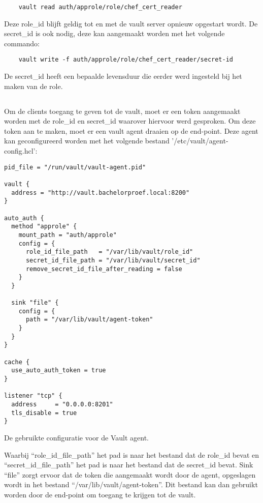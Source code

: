 \begin{verbatim}
    vault read auth/approle/role/chef_cert_reader
\end{verbatim}

Deze role\_id blijft geldig tot en met de vault server opnieuw opgestart wordt. De secret\_id is ook nodig, deze kan aangemaakt worden met het volgende commando:
\begin{verbatim}
    vault write -f auth/approle/role/chef_cert_reader/secret-id
\end{verbatim}
De secret\_id heeft een bepaalde levensduur die eerder werd ingesteld bij het maken van de role.

\subsection{}
\label{subsec:Installeren_van_een_Vault_agent}

Om de clients toegang te geven tot de vault, moet er een token aangemaakt worden met de role\_id en secret\_id waarover hiervoor werd gesproken. Om deze token aan te maken, moet er een vault agent draaien op de end-point.
Deze agent kan geconfigureerd worden met het volgende bestand '/etc/vault/agent-config.hcl':

\begin{listing}[H]
\begin{verbatim}
pid_file = "/run/vault/vault-agent.pid"

vault {
  address = "http://vault.bachelorproef.local:8200"
}

auto_auth {
  method "approle" {
    mount_path = "auth/approle"
    config = {
      role_id_file_path   = "/var/lib/vault/role_id"
      secret_id_file_path = "/var/lib/vault/secret_id"
      remove_secret_id_file_after_reading = false
    }
  }

  sink "file" {
    config = {
      path = "/var/lib/vault/agent-token"
    }
  }
}

cache {
  use_auto_auth_token = true
}

listener "tcp" {
  address     = "0.0.0.0:8201"
  tls_disable = true
}
\end{verbatim}
\caption[De configuratie voor Vault Agent]{De gebruikte configuratie voor de Vault agent.}
\end{listing}

Waarbij ``role\_id\_file\_path'' het pad is naar het bestand dat de role\_id bevat en ``secret\_id\_file\_path'' het pad is naar het bestand dat de secret\_id bevat. 
Sink ``file'' zorgt ervoor dat de token die aangemaakt wordt door de agent, opgeslagen wordt in het bestand ``/var/lib/vault/agent-token''. Dit bestand kan dan gebruikt worden door de end-point om toegang te krijgen tot de vault. \\

